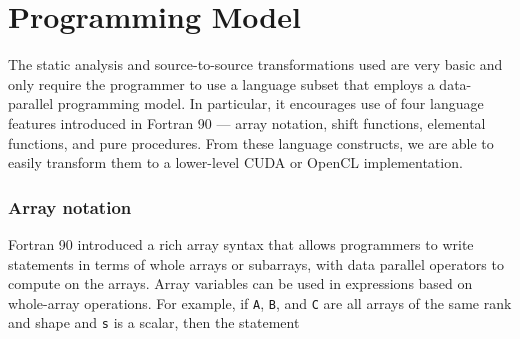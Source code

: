 \section{Programming Model}

The static analysis and source-to-source transformations used are very
basic and only require the programmer to use a language subset that
employs a data-parallel programming model.  In particular, it
encourages use of four language features introduced in Fortran 90 ---
array notation, shift functions, elemental functions, and pure
procedures.  From these language constructs, we are able to easily
transform them to a lower-level CUDA or OpenCL implementation.


\subsubsection*{Array notation}

Fortran 90 introduced a rich array syntax that allows programmers to
write statements in terms of whole arrays or subarrays, with
data parallel operators to compute on the arrays.
Array variables can be used in expressions
based on whole-array operations.  For example, if {\tt A}, {\tt B},
and {\tt C} are all arrays of the same rank and shape and {\tt s} is a
scalar, then the statement



